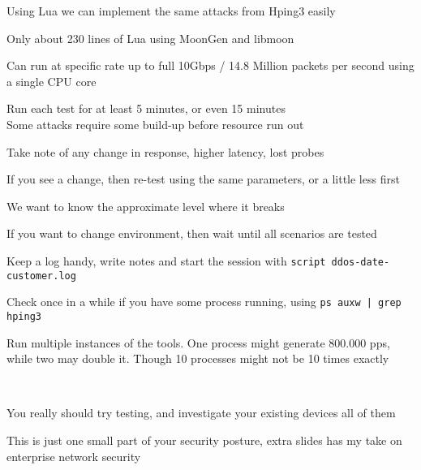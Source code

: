 \documentclass[Screen16to9,17pt]{foils}
\begin{document}
\begin{list2}
\item Using Lua we can implement the same attacks from Hping3 easily
\item Only about 230 lines of Lua using MoonGen and libmoon
\item Can run at specific rate up to full 10Gbps / 14.8 Million packets per second using a single CPU core
\end{list2}



\begin{list2}
\item Run each test for at least 5 minutes, or even 15 minutes\\
Some attacks require some build-up before resource run out
\item Take note of any change in response, higher latency, lost probes
\item If you see a change, then re-test using the same parameters, or a little less first
\item We want to know the approximate level where it breaks
\item If you want to change environment, then wait until all scenarios are tested
\item Keep a log handy, write notes and start the session with \verb+script ddos-date-customer.log+
\item Check once in a while if you have some process running, using \verb+ps auxw | grep hping3+
\item Run multiple instances of the tools. One process might generate 800.000 pps, while two may double it. Though 10 processes might not be 10 times exactly
\end{list2}



~
\begin{list2}
\item You really should try testing, and investigate your existing devices
all of them
\item This is just one small part of your security posture, extra slides has my take on enterprise network security
\end{list2}

\myquestionspage




\end{document}
